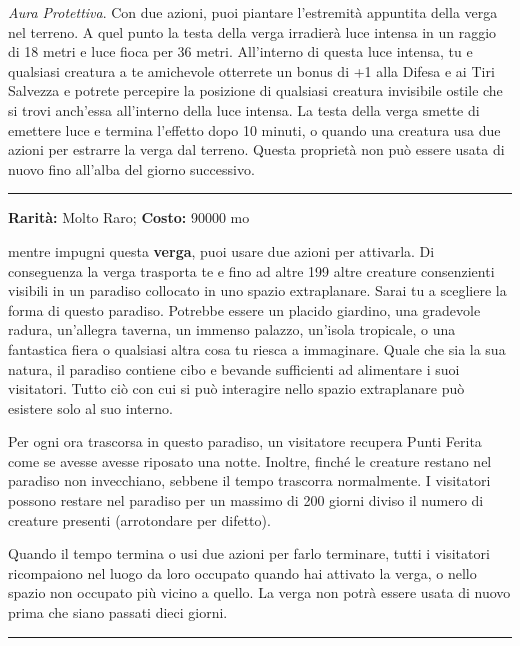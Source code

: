 \begin{multicols}{2}
\emph{Aura Protettiva}. Con due azioni, puoi piantare l'estremità appuntita della verga nel terreno. A quel punto la testa della verga irradierà luce intensa in un raggio di 18 metri e luce fioca per 36 metri. All'interno di questa luce intensa, tu e qualsiasi creatura a te amichevole otterrete un bonus di +1 alla Difesa e ai Tiri Salvezza e potrete percepire la posizione di qualsiasi creatura invisibile ostile che si trovi anch'essa all'interno della luce intensa. La testa della verga smette di emettere luce e termina l'effetto dopo 10 minuti, o quando una creatura usa due azioni per estrarre la verga dal terreno. Questa proprietà non può essere usata di nuovo fino all'alba del giorno successivo.

\smallskip\noindent\rule{\linewidth}{2pt}  \hypertarget{VergadellaSicurezza}{}\medskip{}\noindent\label{VergadellaSicurezza}

\textbf{Rarità:} Molto Raro; \textbf{Costo:} 90000 mo

mentre impugni questa \textbf{verga}, puoi usare due azioni per attivarla. Di conseguenza la verga trasporta te e fino ad altre 199 altre creature consenzienti visibili in un paradiso collocato in uno spazio extraplanare. Sarai tu a scegliere la forma di questo paradiso. Potrebbe essere un placido giardino, una gradevole radura, un'allegra taverna, un immenso palazzo, un'isola tropicale, o una fantastica fiera o qualsiasi altra cosa tu riesca a immaginare. Quale che sia la sua natura, il paradiso contiene cibo e bevande sufficienti ad alimentare i suoi visitatori. Tutto ciò con cui si può interagire nello spazio extraplanare può esistere solo al suo interno.

Per ogni ora trascorsa in questo paradiso, un visitatore recupera Punti Ferita come se avesse avesse riposato una notte. Inoltre, finché le creature restano nel paradiso non invecchiano, sebbene il tempo trascorra normalmente. I visitatori possono restare nel paradiso per un massimo di 200 giorni diviso il numero di creature presenti (arrotondare per difetto).

Quando il tempo termina o usi due azioni per farlo terminare, tutti i visitatori ricompaiono nel luogo da loro occupato quando hai attivato la verga, o nello spazio non occupato più vicino a quello. La verga non potrà essere usata di nuovo prima che siano passati dieci giorni.

\smallskip\noindent\rule{\linewidth}{2pt}  \hypertarget{VergadellaSovranità}{}\medskip{}\noindent\label{VergadellaSovranità}


\end{multicols}
